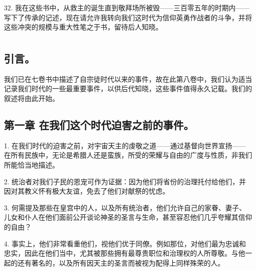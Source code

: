 32. 我在这些书中，从救主的诞生直到敬拜场所被毁——三百零五年的时期内——写下了传承的记述，现在请允许我转向我们这时代为信仰英勇作战者的斗争，并将这些冲突的规模与重大性笔之于书，留待后人知晓。\par



\section{}


\subsection{引言。}

我们已在七卷书中描述了自宗徒时代以来的事件，故在此第八卷中，我们认为适当记录我们时代的一些最重要事件，以供后代知晓，这些事件值得永久记载。我们的叙述将由此开始。\par


\subsection{第一章 在我们这个时代迫害之前的事件。}

1. 在我们时代的迫害之前，对宇宙天主的虔敬之道——通过基督向世界宣扬——在所有民族中，无论是希腊人还是蛮族，所受的荣耀与自由的广度与性质，非我们所能恰当地描述。\par

2. 统治者对我们子民的恩宠可作为证据：因为他们将省份的治理托付给他们，并因对其教义怀有极大友谊，免去了他们对献祭的忧虑。\par

3. 何需提及那些在皇宫中的人，以及所有统治者，他们允许自己的家眷、妻子、儿女和仆人在他们面前公开谈论神圣的圣言与生命，甚至容忍他们几乎夸耀其信仰的自由？\par

4. 事实上，他们非常看重他们，视他们优于同僚。例如那位，对他们最为忠诚和忠实，因此在他们当中，尤其被那些拥有最尊贵职位和治理权的人所尊敬。与他一起的还有著名的，以及所有因天主的圣言而被视为配得上同样殊荣的人。\par

